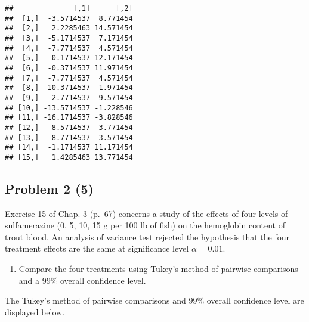 \documentclass[12pt,]{article}
\providecommand{\tightlist}{%
  \setlength{\itemsep}{0pt}\setlength{\parskip}{0pt}}
\begin{document}
\begin{verbatim}
##              [,1]      [,2]
##  [1,]  -3.5714537  8.771454
##  [2,]   2.2285463 14.571454
##  [3,]  -5.1714537  7.171454
##  [4,]  -7.7714537  4.571454
##  [5,]  -0.1714537 12.171454
##  [6,]  -0.3714537 11.971454
##  [7,]  -7.7714537  4.571454
##  [8,] -10.3714537  1.971454
##  [9,]  -2.7714537  9.571454
## [10,] -13.5714537 -1.228546
## [11,] -16.1714537 -3.828546
## [12,]  -8.5714537  3.771454
## [13,]  -8.7714537  3.571454
## [14,]  -1.1714537 11.171454
## [15,]   1.4285463 13.771454
\end{verbatim}

\subsection{Problem 2 (5)}\label{problem-2-5}

Exercise 15 of Chap. 3 (p.~67) concerns a study of the effects of four
levels of sulfamerazine (0, 5, 10, 15 g per 100 lb of fish) on the
hemoglobin content of trout blood. An analysis of variance test rejected
the hypothesis that the four treatment effects are the same at
significance level \(\alpha=0.01\).

\begin{enumerate}
\def\labelenumi{(\alph{enumi})}
\tightlist
\item
  Compare the four treatments using Tukey's method of pairwise
  comparisons and a 99\% overall confidence level.
\end{enumerate}

The Tukey's method of pairwise comparisons and 99\% overall confidence
level are displayed below.
\end{document}
